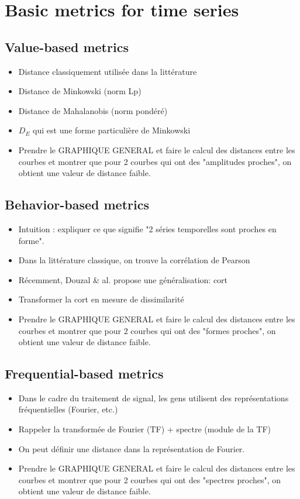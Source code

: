 \section{Basic metrics for time series}
\subsection{Value-based metrics}
\begin{itemize}
	\item Distance classiquement utilisée dans la littérature 
	\item Distance de Minkowski (norm Lp)
	\item Distance de Mahalanobis (norm pondéré)
	\item $D_E$	qui est une forme particulière de Minkowski
	\item Prendre le GRAPHIQUE GENERAL et faire le calcul des distances entre les courbes et montrer que pour 2 courbes qui ont des "amplitudes proches", on obtient une valeur de distance faible. 
\end{itemize}

\subsection{Behavior-based metrics}
\begin{itemize}
	\item Intuition : expliquer ce que signifie "2 séries temporelles sont proches en forme".
	\item Dans la littérature classique, on trouve la corrélation de Pearson
	\item Récemment, Douzal \& al. propose une généralisation: cort
	\item Transformer la cort en mesure de dissimilarité
	\item Prendre le GRAPHIQUE GENERAL et faire le calcul des distances entre les courbes et montrer que pour 2 courbes qui ont des "formes proches", on obtient une valeur de distance faible. 
\end{itemize}

\subsection{Frequential-based metrics}
\begin{itemize}
	\item Dans le cadre du traitement de signal, les gens utilisent des représentations fréquentielles (Fourier, etc.)
	\item Rappeler la transformée de Fourier (TF) + spectre (module de la TF)
	\item On peut définir une distance dans la représentation de Fourier.
	\item Prendre le GRAPHIQUE GENERAL et faire le calcul des distances entre les courbes et montrer que pour 2 courbes qui ont des "spectres proches", on obtient une valeur de distance faible. 
\end{itemize}

